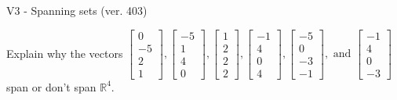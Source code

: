 \begin{exercise}
  \begin{exerciseTitle}V3 - Spanning sets (ver. 403)\end{exerciseTitle}
  \begin{exerciseStatement}
    Explain why the vectors \(\left[\begin{array}{r}
0 \\
-5 \\
2 \\
1
\end{array}\right] , \left[\begin{array}{r}
-5 \\
1 \\
4 \\
0
\end{array}\right] , \left[\begin{array}{r}
1 \\
2 \\
2 \\
2
\end{array}\right] , \left[\begin{array}{r}
-1 \\
4 \\
0 \\
4
\end{array}\right] , \left[\begin{array}{r}
-5 \\
0 \\
-3 \\
-1
\end{array}\right] , \text{ and } \left[\begin{array}{r}
-1 \\
4 \\
0 \\
-3
\end{array}\right]\) span or don't span \(\mathbb{R}^4\). 
	



\end{exerciseStatement}
\end{exercise}
